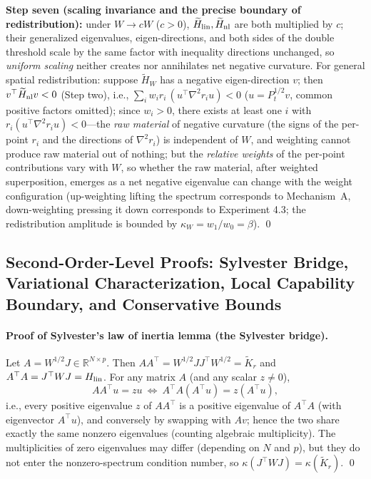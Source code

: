 \documentclass[11pt]{article}
\newcommand{\R}{\mathbb R}
\newcommand{\W}{W}
\newcommand{\wt}[1]{\widetilde{#1}}
\numberwithin{equation}{section}
\begin{document}
\noindent\textbf{Step seven (scaling invariance and the precise boundary of redistribution):} under $\W\to c\W$ ($c>0$), $\wt H_{\rm lin},\wt H_{\rm nl}$ are both multiplied by $c$; their generalized eigenvalues, eigen-directions, and both sides of the double threshold scale by the same factor with inequality directions unchanged, so \emph{uniform scaling} neither creates nor annihilates net negative curvature. For general spatial redistribution: suppose $\wt H_\W$ has a negative eigen-direction $v$; then $v^\top\wt H_{\rm nl}v<0$ (Step two), i.e., $\sum_i w_i r_i\,(u^\top\nabla^2r_i u)<0$ ($u=P_t^{1/2}v$, common positive factors omitted); since $w_i>0$, there exists at least one $i$ with $r_i(u^\top\nabla^2r_i u)<0$---the \emph{raw material} of negative curvature (the signs of the per-point $r_i$ and the directions of $\nabla^2r_i$) is independent of $\W$, and weighting cannot produce raw material out of nothing; but the \emph{relative weights} of the per-point contributions vary with $\W$, so whether the raw material, after weighted superposition, emerges as a net negative eigenvalue can change with the weight configuration (up-weighting lifting the spectrum corresponds to Mechanism~A, down-weighting pressing it down corresponds to Experiment 4.3; the redistribution amplitude is bounded by $\kappa_{\W}=w_1/w_0=\beta$). \qed

\subsection{Second-Order-Level Proofs: Sylvester Bridge, Variational Characterization, Local Capability Boundary, and Conservative Bounds}
\paragraph{Proof of Sylvester's law of inertia lemma (the Sylvester bridge).}
Let $A=\W^{1/2}J\in\R^{N\times p}$. Then $AA^\top=\W^{1/2}JJ^\top\W^{1/2}=\widetilde K_r$ and $A^\top A=J^\top\W J=H_{\rm lin}$. For any matrix $A$ (and any scalar $z\ne0$),
\[
AA^\top u=zu\ \Longleftrightarrow\ A^\top A(A^\top u)=z(A^\top u),
\]
i.e., every positive eigenvalue $z$ of $AA^\top$ is a positive eigenvalue of $A^\top A$ (with eigenvector $A^\top u$), and conversely by swapping with $Av$; hence the two share exactly the same nonzero eigenvalues (counting algebraic multiplicity). The multiplicities of zero eigenvalues may differ (depending on $N$ and $p$), but they do not enter the nonzero-spectrum condition number, so $\kappa(J^\top\W J)=\kappa(\widetilde K_r)$. \qed
\end{document}
